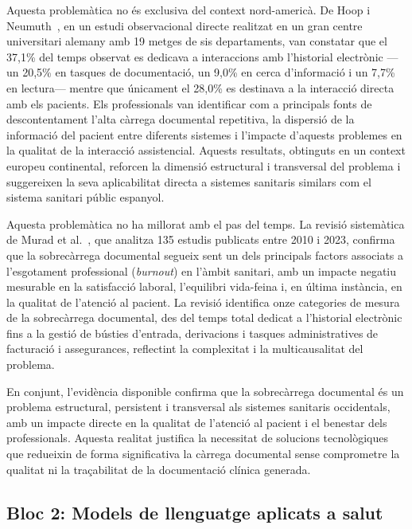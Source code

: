 \documentclass[CAT]{TFUOC}%
\begin{document}
Aquesta problemàtica no és exclusiva del context nord-americà. De Hoop i Neumuth~\cite{dehoop2021ehr}, en un estudi observacional directe realitzat en un gran centre universitari alemany amb 19 metges de sis departaments, van constatar que el 37,1\% del temps observat es dedicava a interaccions amb l'historial electrònic ---un 20,5\% en tasques de documentació, un 9,0\% en cerca d'informació i un 7,7\% en lectura--- mentre que únicament el 28,0\% es destinava a la interacció directa amb els pacients. Els professionals van identificar com a principals fonts de descontentament l'alta càrrega documental repetitiva, la dispersió de la informació del pacient entre diferents sistemes i l'impacte d'aquests problemes en la qualitat de la interacció assistencial. Aquests resultats, obtinguts en un context europeu continental, reforcen la dimensió estructural i transversal del problema i suggereixen la seva aplicabilitat directa a sistemes sanitaris similars com el sistema sanitari públic espanyol.

Aquesta problemàtica no ha millorat amb el pas del temps. La revisió sistemàtica de Murad et al.~\cite{murad2024documentation}, que analitza 135 estudis publicats entre 2010 i 2023, confirma que la sobrecàrrega documental segueix sent un dels principals factors associats a l'esgotament professional (\textit{burnout}) en l'àmbit sanitari, amb un impacte negatiu mesurable en la satisfacció laboral, l'equilibri vida-feina i, en última instància, en la qualitat de l'atenció al pacient. La revisió identifica onze categories de mesura de la sobrecàrrega documental, des del temps total dedicat a l'historial electrònic fins a la gestió de bústies d'entrada, derivacions i tasques administratives de facturació i assegurances, reflectint la complexitat i la multicausalitat del problema.

En conjunt, l'evidència disponible confirma que la sobrecàrrega documental és un problema estructural, persistent i transversal als sistemes sanitaris occidentals, amb un impacte directe en la qualitat de l'atenció al pacient i el benestar dels professionals. Aquesta realitat justifica la necessitat de solucions tecnològiques que redueixin de forma significativa la càrrega documental sense comprometre la qualitat ni la traçabilitat de la documentació clínica generada.

\subsection{Bloc 2: Models de llenguatge aplicats a salut}
\end{document}

